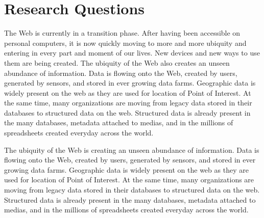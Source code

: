\begin{figure}[ht!]
\end{figure}



\section{Research Questions}
\label{sec:questions}

The Web is currently in a transition phase. After having been accessible on personal computers, it is now 
quickly moving to more and more ubiquity and entering in every part and moment of our lives. New 
devices and new ways to use them are being created. The ubiquity of the Web also creates an unseen 
abundance of information. Data is flowing onto the Web, created by users, generated by sensors, and 
stored in ever growing data farms. Geographic data is widely present on the web as they are used for location 
of Point of Interest. At the same time, many organizations are moving from legacy data stored in their databases
to structured data on the web. Structured data is already present in the many databases, metadata attached to medias, and in the millions of spreadsheets created everyday across the world. 

The ubiquity of the Web is creating an unseen abundance of information. Data is flowing onto the Web, created by users, generated by sensors, and stored in ever growing data farms. Geographic data is widely present on the web as they are used for location of Point of Interest. At the same time, many organizations are moving from legacy data stored in their databases to structured data on the web. Structured data is already present in the many databases, metadata attached to medias, and in the millions of spreadsheets created everyday across the world.

